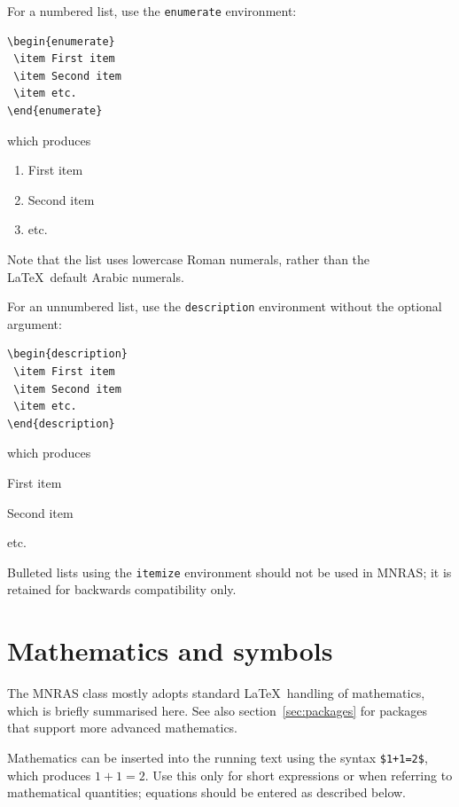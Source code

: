 \documentclass[a4paper,fleqn,usenatbib,useAMS]{mnras}
\begin{document}
For a numbered list, use the \verb'enumerate' environment:
\begin{verbatim}
\begin{enumerate}
 \item First item
 \item Second item
 \item etc.
\end{enumerate}
\end{verbatim}
\noindent which produces
\begin{enumerate}
 \item First item
 \item Second item
 \item etc.
\end{enumerate}
Note that the list uses lowercase Roman numerals, rather than the \LaTeX\ default Arabic numerals.

For an unnumbered list, use the \verb'description' environment without the optional argument:
\begin{verbatim}
\begin{description}
 \item First item
 \item Second item
 \item etc.
\end{description}
\end{verbatim}
\noindent which produces
\begin{description}
 \item First item
 \item Second item
 \item etc.
\end{description}

Bulleted lists using the \verb'itemize' environment should not be used in MNRAS; it is retained for backwards compatibility only.

\section{Mathematics and symbols}

The MNRAS class mostly adopts standard \LaTeX\ handling of mathematics, which is briefly summarised here.
See also section~\ref{sec:packages} for packages that support more advanced mathematics.

Mathematics can be inserted into the running text using the syntax \verb'$1+1=2$', which produces $1+1=2$.
Use this only for short expressions or when referring to mathematical quantities; equations should be entered as described below.
\end{document}
